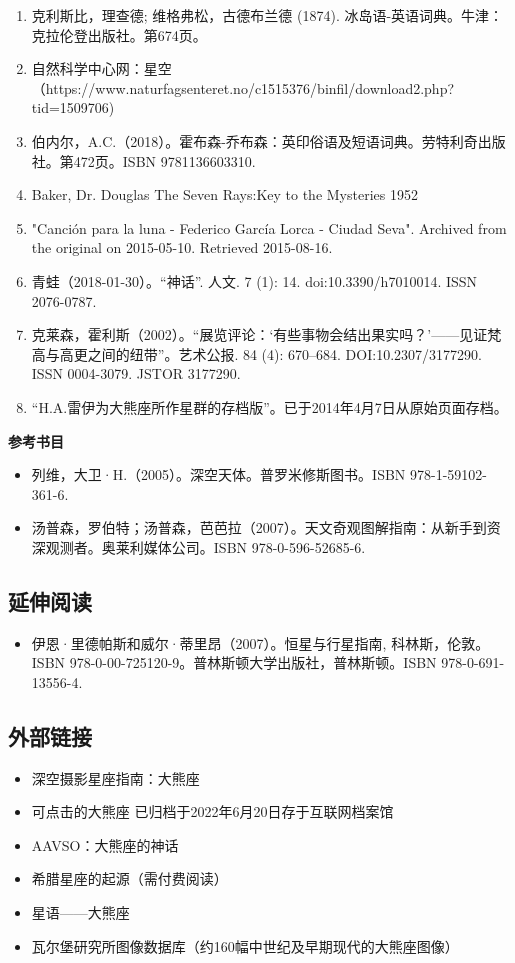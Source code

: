 \begin{enumerate}
\item 克利斯比，理查德; 维格弗松，古德布兰德 (1874). 冰岛语-英语词典。牛津：克拉伦登出版社。第674页。
\item 自然科学中心网：星空（https://www.naturfagsenteret.no/c1515376/binfil/download2.php?tid=1509706)
\item 伯内尔，A.C.（2018）。霍布森-乔布森：英印俗语及短语词典。劳特利奇出版社。第472页。ISBN 9781136603310.
\item Baker, Dr. Douglas The Seven Rays:Key to the Mysteries 1952
\item "Canción para la luna - Federico García Lorca - Ciudad Seva". Archived from the original on 2015-05-10. Retrieved 2015-08-16.
\item  青蛙（2018-01-30）。“神话”. 人文. 7 (1): 14. doi:10.3390/h7010014. ISSN 2076-0787.
\item 克莱森，霍利斯（2002）。“展览评论：‘有些事物会结出果实吗？’——见证梵高与高更之间的纽带”。艺术公报. 84 (4): 670–684. DOI:10.2307/3177290. ISSN 0004-3079. JSTOR 3177290.
\item “H.A.雷伊为大熊座所作星群的存档版”。已于2014年4月7日从原始页面存档。
\end{enumerate}
\textbf{参考书目}
\begin{itemize}
\item 列维，大卫·H.（2005）。深空天体。普罗米修斯图书。ISBN 978-1-59102-361-6.
\item 汤普森，罗伯特；汤普森，芭芭拉（2007）。天文奇观图解指南：从新手到资深观测者。奥莱利媒体公司。ISBN 978-0-596-52685-6.
\end{itemize}
\subsection{延伸阅读}
\begin{itemize}
\item 伊恩·里德帕斯和威尔·蒂里昂（2007）。恒星与行星指南, 科林斯，伦敦。ISBN 978-0-00-725120-9。普林斯顿大学出版社，普林斯顿。ISBN 978-0-691-13556-4.
\end{itemize}
\subsection{外部链接}
\begin{itemize}
\item 深空摄影星座指南：大熊座
\item 可点击的大熊座 已归档于2022年6月20日存于互联网档案馆
\item AAVSO：大熊座的神话
\item 希腊星座的起源（需付费阅读）
\item 星语——大熊座
\item 瓦尔堡研究所图像数据库（约160幅中世纪及早期现代的大熊座图像）
\end{itemize}